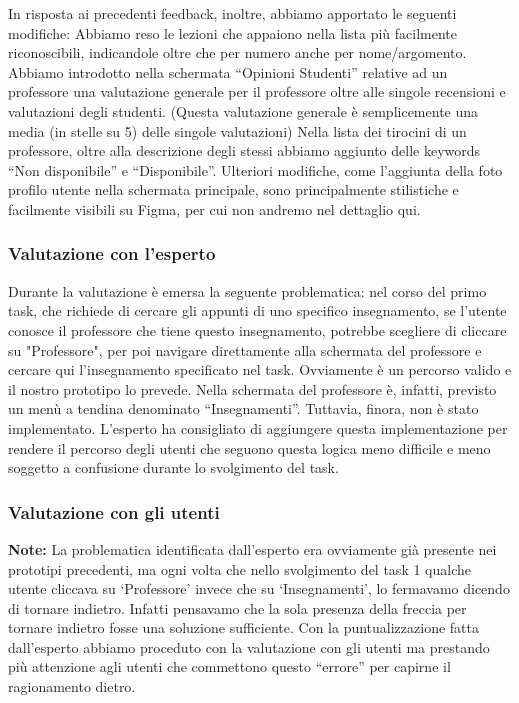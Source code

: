 In risposta ai precedenti feedback, inoltre, abbiamo apportato le seguenti modifiche:
Abbiamo reso le lezioni che appaiono nella lista più facilmente riconoscibili, indicandole oltre che per numero anche per nome/argomento.
Abbiamo introdotto nella schermata “Opinioni Studenti” relative ad un professore una valutazione generale per il professore oltre alle singole recensioni e valutazioni degli studenti.
(Questa valutazione generale è semplicemente una media (in stelle su 5) delle singole valutazioni)
Nella lista dei tirocini di un professore, oltre alla descrizione degli stessi abbiamo aggiunto delle keywords “Non disponibile” e “Disponibile”.
Ulteriori modifiche, come l’aggiunta della foto profilo utente nella schermata principale, sono principalmente stilistiche e facilmente visibili su Figma, per cui non andremo nel dettaglio qui.

\subsubsection{Valutazione con l'esperto}
Durante la valutazione è emersa la seguente problematica: nel corso del primo task, che richiede di cercare gli appunti di uno specifico insegnamento, se l’utente conosce il professore che tiene questo
insegnamento, potrebbe scegliere di cliccare su "Professore", per poi navigare direttamente alla schermata del professore e cercare qui l’insegnamento specificato nel task.
Ovviamente è un percorso valido e il nostro prototipo lo prevede. Nella schermata del professore è, infatti, previsto un menù a tendina denominato “Insegnamenti”. Tuttavia, finora, non è stato implementato.
L’esperto ha consigliato di aggiungere questa implementazione per rendere il percorso degli utenti che seguono questa logica meno difficile e meno soggetto a confusione durante lo svolgimento del task.

\subsubsection{Valutazione con gli utenti}
\textbf{Note:} La problematica identificata dall’esperto era ovviamente già presente nei prototipi precedenti, ma ogni volta che nello svolgimento del task 1 qualche utente cliccava su ‘Professore’ invece che su ‘Insegnamenti’, lo fermavamo dicendo di tornare indietro.
Infatti pensavamo che la sola presenza della freccia per tornare indietro fosse una soluzione sufficiente. Con la puntualizzazione fatta dall’esperto abbiamo proceduto con la valutazione con gli utenti ma prestando più attenzione agli utenti che commettono questo “errore” per capirne il ragionamento dietro.

